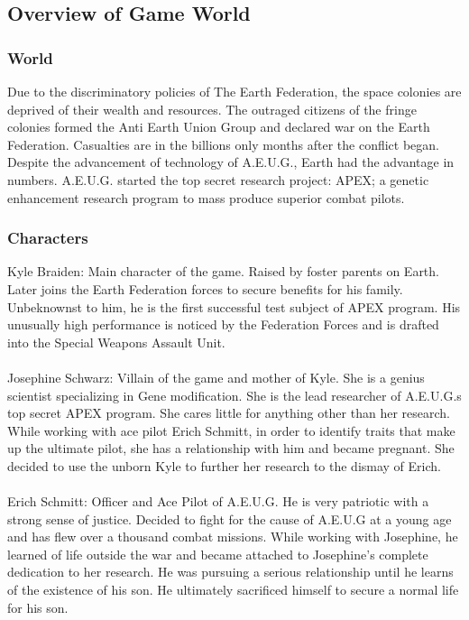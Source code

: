 \documentclass{article}
\begin{document}
\subsection*{Overview of Game World}
    \subsubsection*{World}
     Due to the discriminatory policies of The Earth Federation, the space colonies are deprived of their wealth and resources. The outraged citizens of the fringe colonies formed the Anti Earth Union Group and declared war on the Earth Federation. Casualties are in the billions only months after the conflict began.
    Despite the advancement of technology of A.E.U.G., Earth had the advantage in numbers. A.E.U.G. started the top secret research project: APEX; a genetic enhancement research program to mass produce superior combat pilots.
    \subsubsection*{Characters}
    Kyle Braiden: Main character of the game. Raised by foster parents on Earth. Later joins the Earth Federation forces to secure benefits for his family. Unbeknownst to him, he is the first successful test subject of APEX program. His unusually high performance is noticed by the Federation Forces and is drafted into the Special Weapons Assault Unit.\\\\
    Josephine Schwarz: Villain of the game and mother of Kyle. She is a genius scientist specializing in Gene modification. She is the lead researcher of A.E.U.G.s top secret APEX program. She cares little for anything other than her research. While working with ace pilot Erich Schmitt, in order to identify traits that make up the ultimate pilot, she has a relationship with him and became pregnant. She decided to use the unborn Kyle to further her research to the dismay of Erich.\\\\
    Erich Schmitt: Officer and Ace Pilot of A.E.U.G. He is very patriotic with a strong sense of justice. Decided to fight for the cause of A.E.U.G at a young age and has flew over a thousand combat missions. While working with Josephine, he learned of life outside the war and became attached to Josephine’s complete dedication to her research. He was pursuing a serious relationship until he learns of the existence of his son. He ultimately sacrificed himself to secure a normal life for his son.
    
\end{document}
